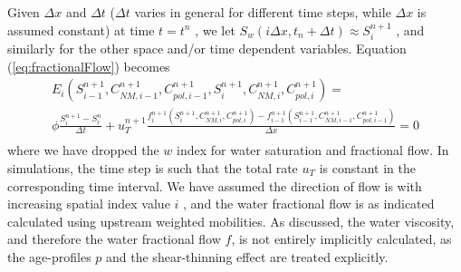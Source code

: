 \documentclass[nanomaterials,article,submit,moreauthors,pdftex]{Definitions/mdpi}
\begin{document}
Given  $\Delta x$ and $\Delta t$ ($\Delta t$  varies in general for different time steps, while $\Delta x$ is assumed constant) at time $t=t^n$ , we let $S_w(i\Delta x, t_n+\Delta t) \approx S_i^{n+1}$ , and similarly for the other space and/or time dependent variables. Equation (\ref{eq:fractionalFlow}) becomes
\begin{multline}%
    E_i \left(S^{n+1}_{i-1}, C^{n+1}_{\textit{NM}, i-1}, C^{n+1}_{pol, i-1}, S^{n+1}_{i}, C^{n+1}_{\textit{NM}, i}, C^{n+1}_{pol, i}\right)  = \\ \phi\frac{S^{n+1}_{i}-S^{n}_{i}}{\Delta t} +u_T^{n+1}\frac{f_i^{n+1}\left(S^{n+1}_{i}, C^{n+1}_{\textit{NM}, i}, C^{n+1}_{pol, i}  \right) - f_{i-1}^{n+1}\left(S^{n+1}_{i-1}, C^{n+1}_{\textit{NM}, i-1}, C^{n+1}_{pol, i-1}  \right)}{\Delta x}  = 0 \\
    \quad
\end{multline} 
where we have dropped the $w$  index for water saturation and fractional flow. In simulations, the time step is such that the total rate  $u_T$ is constant in the corresponding time interval. We have assumed the direction of flow is with increasing spatial index value $i$ , and the water fractional flow is as indicated calculated using upstream weighted mobilities. As discussed, the water viscosity, and therefore the water fractional flow $f$, is not entirely implicitly calculated, as the age-profiles $p$ and the shear-thinning effect are treated explicitly.
\end{document}
